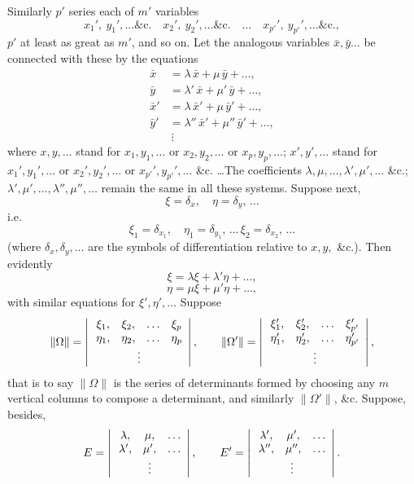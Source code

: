 \documentclass[11pt]{article}
\begin{document}
Similarly $p'$ series each of $m'$ variables
\[
x_1',\ y_1',\ldots\&\text{c.}\quad x_2',\ y_2',\ldots\&\text{c.}\quad \ldots\quad x_{p'}',\ y_{p'}',\ldots\&\text{c.},
\]
$p'$ at least as great as $m'$, and so on. Let the analogous variables $\bar{x}, \bar{y}\ldots$ be connected
with these by the equations
\[
\begin{aligned}
\bar{x} &= \lambda\,\bar{x} + \mu\,\bar{y} + \ldots,\\
\bar{y} &= \lambda'\,\bar{x} + \mu'\,\bar{y} + \ldots,\\
\bar{x}' &= \lambda\,\bar{x}' + \mu\,\bar{y}' + \ldots,\\
\bar{y}' &= \lambda''\,\bar{x}' + \mu''\,\bar{y}' + \ldots,\\
&\ \vdots
\end{aligned}
\]
where $x, y, \ldots$ stand for $x_1, y_1, \ldots$ or $x_2, y_2, \ldots$ or $x_p, y_p,\ldots$; $x', y', \ldots$ stand for $x_1', y_1',\ldots$
or $x_2', y_2',\ldots$ or $x_{p'}', y_{p'}',\ldots$ \&c. \ldots The coefficients $\lambda, \mu, \ldots, \lambda', \mu', \ldots$ \&c.; $\lambda', \mu',\ldots, \lambda'', \mu'',\ldots$
remain the same in all these systems. Suppose next,
\[
\xi = \delta_x,\quad \eta = \delta_y,\,\ldots
\]
i.e.
\[
\xi_1 = \delta_{x_1},\quad \eta_1 = \delta_{y_1},\,\ldots\,\xi_2 = \delta_{x_2},\,\ldots
\]
(where $\delta_x, \delta_y,\ldots$ are the symbols of differentiation relative to $x, y,$ \&c.). Then evidently
\[
\xi = \lambda\xi + \lambda'\eta + \ldots,
\]
\[
\eta = \mu\xi + \mu'\eta + \ldots,
\]
with similar equations for $\xi', \eta',\ldots$ Suppose
\[
\|\Omega\| = \left|\,\begin{array}{cccc} \xi_1, & \xi_2, & \ldots & \xi_p \\ \eta_1, & \eta_2, & \ldots & \eta_p \\ \multicolumn{4}{c}{\vdots} \end{array}\right|,\qquad
\|\Omega'\| = \left|\,\begin{array}{cccc} \xi_1', & \xi_2', & \ldots & \xi_{p'}' \\ \eta_1', & \eta_2', & \ldots & \eta_{p'}' \\ \multicolumn{4}{c}{\vdots} \end{array}\right|,
\]
that is to say $\|\Omega\|$ is the series of determinants formed by choosing any $m$ vertical
columns to compose a determinant, and similarly $\|\Omega'\|$, \&c. Suppose, besides,
\[
E = \left|\,\begin{array}{ccc} \lambda, & \mu, & \ldots \\ \lambda', & \mu', & \ldots \\ \multicolumn{3}{c}{\vdots} \end{array}\right|,\qquad
E' = \left|\,\begin{array}{ccc} \lambda', & \mu', & \ldots \\ \lambda'', & \mu'', & \ldots \\ \multicolumn{3}{c}{\vdots} \end{array}\right|.
\]
\end{document}
